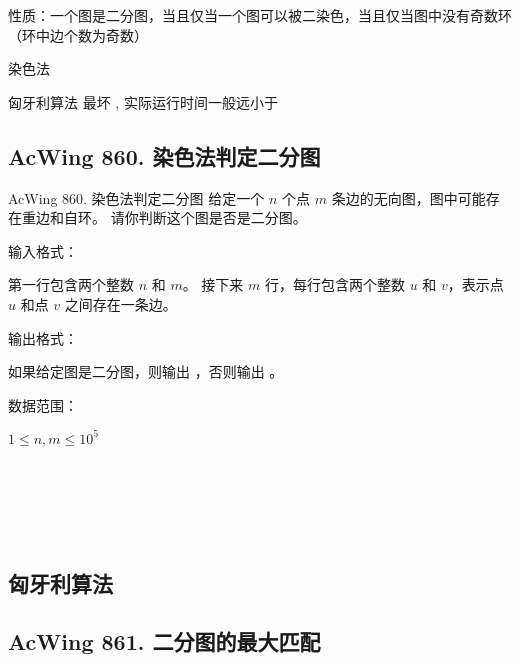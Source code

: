 性质：一个图是二分图，当且仅当一个图可以被二染色，当且仅当图中没有奇数环（环中边个数为奇数）

\begin{myenum}
    \item 染色法 
    \item 匈牙利算法 最坏 , 实际运行时间一般远小于 
\end{myenum}


\subsection{AcWing 860. 染色法判定二分图}
\begin{titledbox}{AcWing 860. 染色法判定二分图}
    给定一个 $n$ 个点 $m$ 条边的无向图，图中可能存在重边和自环。 请你判断这个图是否是二分图。

    输入格式：

    第一行包含两个整数 $n$ 和 $m$。 接下来 $m$ 行，每行包含两个整数 $u$ 和 $v$，表示点 $u$ 和点 $v$ 之间存在一条边。

    输出格式：

    如果给定图是二分图，则输出 ，否则输出 。

    数据范围：

    $1 \le n,m \le 10^5$

    \begin{inputblock}
         \\
         \\
         \\
         \\
    \end{inputblock}
    \begin{outputblock}
    \end{outputblock}
\end{titledbox}

\subsection{匈牙利算法}

\subsection{AcWing 861. 二分图的最大匹配}


